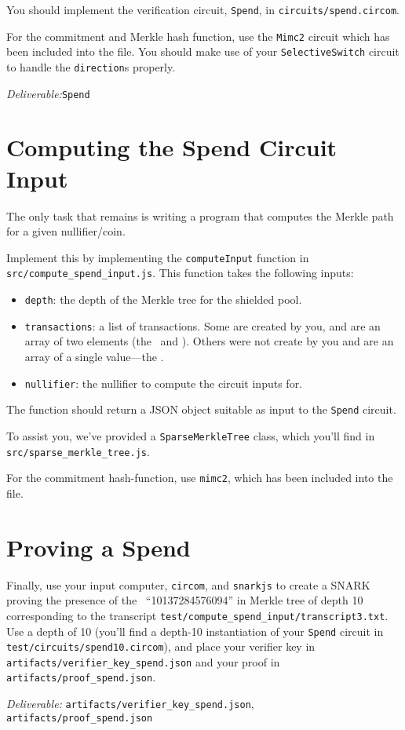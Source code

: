 \documentclass[12pt]{article}
\newcommand{\deliverable}[1]{\begin{tcolorbox}[colback=Gold!8]
\emph{Deliverable:}\xspace #1

\end{tcolorbox}}
\begin{document}
You should implement the verification circuit, \texttt{Spend}, in
\texttt{circuits/spend.circom}.

For the commitment and Merkle hash function, use the \texttt{Mimc2} circuit
which has been included into the file. You should make use of your
\texttt{SelectiveSwitch} circuit to handle the \texttt{direction}s properly.

\deliverable{\texttt{Spend}}

\section{Computing the Spend Circuit Input}

The only task that remains is writing a program that computes the Merkle path
for a given nullifier/coin.

Implement this by implementing the \texttt{computeInput} function in
\texttt{src/compute\_spend\_input.js}. This function takes the following inputs:
\begin{itemize}
  \item \texttt{depth}: the depth of the Merkle tree for the shielded pool.
  \item \texttt{transactions}: a list of transactions. Some are created by you,
    and are an array of two elements (the \nullifier\ and \nonce). Others were
    not create by you and are an array of a single value---the \commitment.
  \item \texttt{nullifier}: the nullifier to compute the circuit inputs for.
\end{itemize}
The function should return a JSON object suitable as input to the
\texttt{Spend} circuit.

To assist you, we've provided a \texttt{SparseMerkleTree} class, which you'll
find in \texttt{src/sparse\_merkle\_tree.js}.

For the commitment hash-function, use \texttt{mimc2}, which has been included
into the file.

\section{Proving a Spend}

Finally, use your input computer, \texttt{circom}, and \texttt{snarkjs} to
create a SNARK proving the presence of the \nullifier\ ``10137284576094'' in
Merkle tree of depth 10 corresponding to the transcript
\texttt{test/compute\_spend\_input/transcript3.txt}. Use a depth of 10 (you'll
find a depth-10 instantiation of your \texttt{Spend} circuit in
\texttt{test/circuits/spend10.circom}), and place your verifier key in
\texttt{artifacts/verifier\_key\_spend.json} and your proof in
\texttt{artifacts/proof\_spend.json}.
\deliverable{%
\texttt{artifacts/verifier\_key\_spend.json},
\texttt{artifacts/proof\_spend.json}
}
\end{document}

